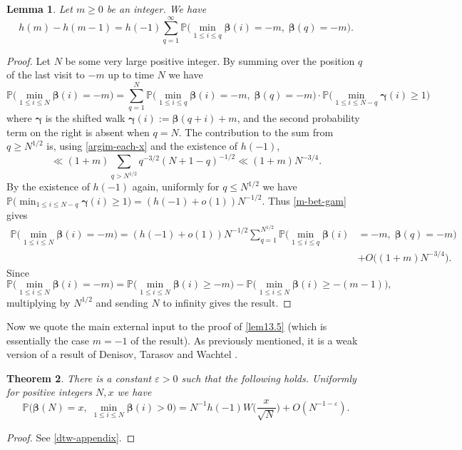 \documentclass[11pt,reqno]{amsart}
\numberwithin{equation}{section}
\newtheorem{theorem}{Theorem}[section]
\newtheorem{lemma}[theorem]{Lemma}
\theoremstyle{definition}
\theoremstyle{remark}
\newcommand{\mb}{\mathbb}
\newcommand{\eps}{\varepsilon}
\def\boldbeta{\boldsymbol\beta}
\def\boldgamma{\boldsymbol\gamma}
\renewcommand{\le}{\leqslant}
\renewcommand{\ge}{\geqslant}
\begin{document}
\begin{lemma}\label{h-htilde} Let $m \ge 0$ be an integer. We have \[  h(m) - h(m-1) = h(-1) \sum_{q = 1}^{\infty} \mb{P}\big(\min_{1 \le i \le q} \boldbeta(i) = -m,\; \boldbeta(q) = -m\big).\] 
\end{lemma}
\begin{proof} Let $N$ be some very large positive integer. By summing over the position $q$ of the last visit to $-m$ up to time $N$ we have 
\begin{equation}\label{m-bet-gam} \mb{P}\big( \min_{1 \le i \le N} \boldbeta(i) = -m\big) = \sum_{q = 1}^N \mb{P}\big(\min_{1 \le i \le q} \boldbeta(i) = -m,\; \boldbeta(q) = -m\big) \cdot \mb{P}\big(\min_{1 \le i \le N - q} \boldgamma(i) \ge 1\big)\end{equation} where $\boldgamma$ is the shifted walk $\boldgamma(i) := \boldbeta(q + i) + m$, and the second probability term on the right is absent when $q = N$. The contribution to the sum from $q \ge N^{1/2}$ is, using \cref{argim-each-x} and the existence of $h(-1)$,
\[ \ll (1 + m) \sum_{q > N^{1/2}} q^{-3/2} (N +1 - q)^{-1/2} \ll (1 + m) N^{-3/4}.\] By the existence of $h(-1)$ again, uniformly for $q \le N^{1/2}$ we have $\mb{P}\big(\min_{1 \le i \le N - q} \boldgamma(i) \ge 1\big) =  (h(-1) + o(1)) N^{-1/2}$.  Thus \cref{m-bet-gam} gives
\begin{align*} \mb{P}\big( \min_{1 \le i \le N} \boldbeta(i) = -m\big) = (h(-1) + o(1)) N^{-1/2}\sum_{q = 1}^{N^{1/2}} \mb{P}\big(\min_{1 \le i \le q} \boldbeta(i) & = -m,\; \boldbeta(q) = -m\big) \\ & + O \big( (1 + m) N^{-3/4}\big).\end{align*}
Since 
\[ \mb{P}\big( \min_{1 \le i \le N} \boldbeta(i) = -m\big) = \mb{P}\big( \min_{1 \le i \le N} \boldbeta(i) \ge -m\big) - \mb{P}\big( \min_{1 \le i \le N} \boldbeta(i) \ge  -(m-1)\big),\] multiplying by $N^{1/2}$ and sending $N$ to infinity gives the result.
\end{proof}

Now we quote the main external input to the proof of \cref{lem13.5} (which is essentially the case $m = -1$ of the result). As previously mentioned, it is a weak version of a result of Denisov, Tarasov and Wachtel \cite[Theorem 1]{DTW24b}.

\begin{theorem}\label{dtw-thm}
There is a constant $\eps > 0$ such that the following holds. Uniformly for positive integers $N,x$ we have
\begin{equation}\label{loc-limit-crude} \mb{P}\big(\boldbeta(N) = x, \; \min_{1 \le i \le N} \boldbeta(i) > 0\big) = N^{-1}h(-1) W\big(\frac{x}{\sqrt{N}}\big) + O(N^{-1 - \eps}).
\end{equation}
\end{theorem}
\begin{proof} See \cref{dtw-appendix}. 
\end{proof}
\end{document}
